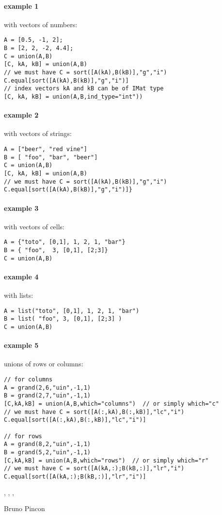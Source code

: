 \begin{examples}

\paragraph{example 1} with vectors of numbers:
\begin{Verbatim}
A = [0.5, -1, 2];
B = [2, 2, -2, 4.4];
C = union(A,B)
[C, kA, kB] = union(A,B)
// we must have C = sort([A(kA),B(kB)],"g","i")
C.equal[sort([A(kA),B(kB)],"g","i")]
// index vectors kA and kB can be of IMat type
[C, kA, kB] = union(A,B,ind_type="int"))
\end{Verbatim}

\paragraph{example 2} with vectors of strings:
\begin{Verbatim}
A = ["beer", "red vine"]
B = [ "foo", "bar", "beer"]
C = union(A,B)
[C, kA, kB] = union(A,B)
// we must have C = sort([A(kA),B(kB)],"g","i")
C.equal[sort([A(kA),B(kB)],"g","i")]}
\end{Verbatim}

\paragraph{example 3} with vectors of cells:
\begin{Verbatim}
A = {"toto", [0,1], 1, 2, 1, "bar"}
B = { "foo",  3, [0,1], [2;3]}
C = union(A,B)
\end{Verbatim}

\paragraph{example 4} with lists:
\begin{Verbatim}
A = list("toto", [0,1], 1, 2, 1, "bar")
B = list( "foo", 3, [0,1], [2;3] )
C = union(A,B)
\end{Verbatim}

\paragraph{example 5} unions of rows or columns:
\begin{Verbatim}
// for columns
A = grand(2,6,"uin",-1,1)
B = grand(2,7,"uin",-1,1)
[C,kA,kB] = union(A,B,which="columns")  // or simply which="c"
// we must have C = sort([A(:,kA),B(:,kB)],"lc","i")
C.equal[sort([A(:,kA),B(:,kB)],"lc","i")]

// for rows
A = grand(8,2,"uin",-1,1)
B = grand(5,2,"uin",-1,1)
[C,kA,kB] = union(A,B,which="rows")  // or simply which="r"
// we must have C = sort([A(kA,:);B(kB,:)],"lr","i")
C.equal[sort([A(kA,:);B(kB,:)],"lr","i")]
\end{Verbatim}

\end{examples}

\begin{manseealso}
  , , ,   
\end{manseealso}

\begin{authors}
  Bruno Pincon
\end{authors}
